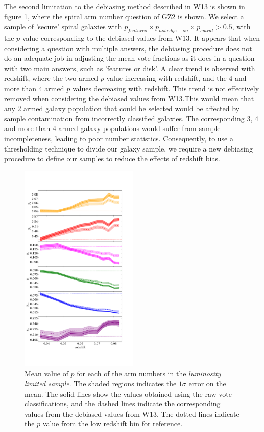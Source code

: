 \documentclass[useAMS,usenatbib]{mn2e}
\begin{document}
The second limitation to the debiasing method described in W13 is shown in figure \ref{fig:arm_bias}, where the spiral arm number question of GZ2 is shown. We select a sample of 'secure' spiral galaxies with $p_{features} \times p_{not \, edge-on} \times p_{spiral} > 0.5$, with the $p$ value corresponding to the debiased values from W13. It appears that when considering a question with multiple answers, the debiasing procedure does not do an adequate job in adjusting the mean vote fractions as it does in a question with two main answers, such as 'features or disk'. A clear trend is observed with redshift, where the two armed $\overline{p}$ value increasing with redshift, and the 4 and more than 4 armed $\overline{p}$ values decreasing with redshift. This trend is not effectively removed when considering the debiased values from W13.This would mean that any 2 armed galaxy population that could be selected would be affected by sample contamination from incorrectly classified galaxies. The corresponding 3, 4 and more than 4 armed galaxy populations would suffer from sample incompleteness, leading to poor number statistics. Consequently, to use a thresholding technique to divide our galaxy sample, we require a new debiasing procedure to define our samples to reduce the effects of redshift bias.

\begin{figure}
		\centering

        \includegraphics[width=0.5\textwidth]{Data_imgs/arm_bias.pdf}

        \caption{Mean value of $p$ for each of the arm numbers in the \textit{luminosity limited sample}. The shaded regions indicates the $1 \sigma$ error on the mean. The solid lines show the values obtained using the raw vote classifications, and the dashed lines indicate the corresponding values from the debiased values from W13. The dotted lines indicate the $p$ value from the low redshift bin for reference.}

        \label{fig:arm_bias}

\end{figure}
\end{document}
